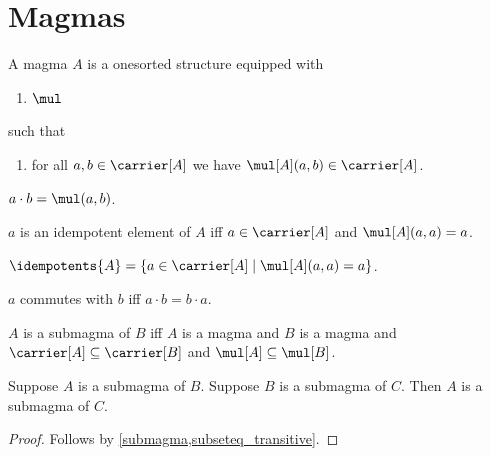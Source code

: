 \section{Magmas}

\begin{struct}\label{magma}
    A magma $A$ is a onesorted structure equipped with
    \begin{enumerate}
        \item $\mul$
    \end{enumerate}
    such that
    \begin{enumerate}
        \item\label{magma_welldef} for all $a, b\in \carrier[A]$ we have $\mul[A](a,b)\in \carrier[A]$.
    \end{enumerate}
\end{struct}

\begin{abbreviation}\label{cdot}
    $a\cdot b = \mul(a,b)$.
\end{abbreviation}

\begin{abbreviation}\label{idempotentelement}
    $a$ is an idempotent element of $A$ iff
    $a\in\carrier[A]$ and
    $\mul[A](a,a) = a$.
\end{abbreviation}


\begin{definition}\label{idempotents}
    $\idempotents{A} = \{a\in\carrier[A]\mid \mul[A](a,a) = a\}$.
\end{definition}


\begin{abbreviation}\label{commutes}
    $a$ commutes with $b$ iff $a\cdot b = b\cdot a$.
\end{abbreviation}

\begin{definition}\label{submagma}
    $A$ is a submagma of $B$ iff
        $A$ is a magma and
        $B$ is a magma and
        $\carrier[A]\subseteq \carrier[B]$ and
        $\mul[A]\subseteq \mul[B]$.
\end{definition}

\begin{proposition}\label{submagma_transitive}
    Suppose $A$ is a submagma of $B$.
    Suppose $B$ is a submagma of $C$.
    Then $A$ is a submagma of $C$.
\end{proposition}
\begin{proof}
    Follows by \cref{submagma,subseteq_transitive}.
\end{proof}

